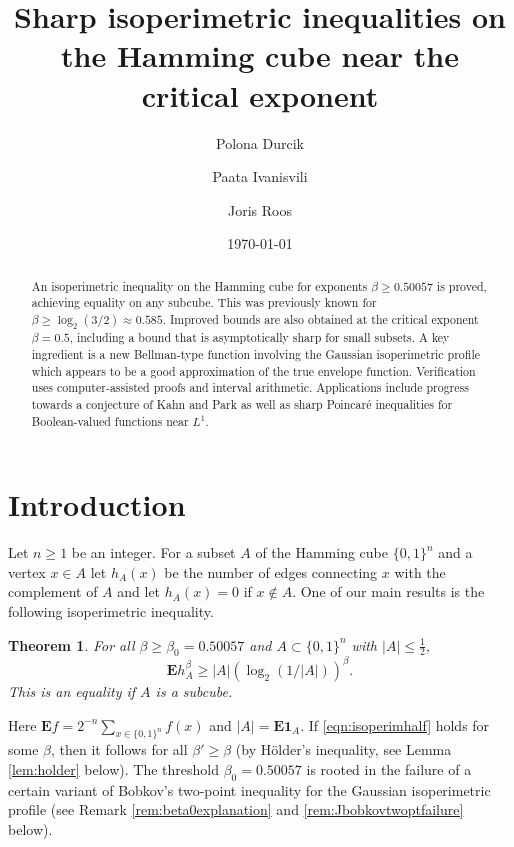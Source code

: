 \documentclass[12pt]{amsart}
\title[Sharp isoperimetric inequalities]{Sharp isoperimetric inequalities on the Hamming cube near the critical exponent}
\author[P. Durcik]{Polona Durcik}
\author[P. Ivanisvili]{Paata Ivanisvili}
\author[J. Roos]{Joris Roos}
\date{\today}
\theoremstyle{plain}
\newtheorem{thm}{Theorem}[section]
\theoremstyle{definition}
\theoremstyle{remark}
\numberwithin{equation}{section}
\begin{document}
\begin{abstract}
An isoperimetric inequality on the Hamming cube for exponents $\beta\ge 0.50057$ is proved, achieving equality on any subcube.  This was previously known for $\beta\ge \log_2(3/2)\approx 0.585$. 
Improved bounds are also obtained at the critical exponent $\beta=0.5$, including a bound that is asymptotically sharp for small subsets.
A key ingredient is a 
new Bellman-type function involving the Gaussian isoperimetric profile which appears to be a good approximation of the true envelope function. 
Verification uses computer-assisted proofs and interval arithmetic.
Applications include progress towards a conjecture of Kahn and Park as well as sharp Poincar\'e inequalities for Boolean-valued functions near $L^1$.
\end{abstract}


\maketitle

\section{Introduction}
Let $n\ge 1$ be an integer.  For a subset $A$ of the Hamming cube $\{0,1\}^n$ and a vertex $x\in A$ let 
$h_A(x)$ be the number of edges connecting $x$ with the complement of $A$ and
let $h_A(x)=0$ if $x\not\in A$. 
One of our main results is the following isoperimetric inequality.

\begin{thm}\label{thm:mainisoperim}
For all $\beta\ge \beta_0=0.50057$ and $A\subset \{0,1\}^n$ with $|A|\le \frac12$, \begin{equation}\label{eqn:isoperimhalf}
\mathbf{E} h_A^\beta \ge |A| (\log_2(1/|A|))^\beta.
\end{equation}
This is an equality if $A$ is a subcube. 
\end{thm}
Here $\mathbf{E}f=2^{-n} \sum_{x\in \{0,1\}^n} f(x)$ and $|A|=\mathbf{E} \mathbf{1}_A$. 
If \eqref{eqn:isoperimhalf} holds for some $\beta$, then it follows for all $\beta'\ge \beta$ (by H\"older's inequality, see Lemma \ref{lem:holder} below). The threshold $\beta_0=0.50057$ is rooted in the failure of a certain variant of Bobkov's two-point inequality for the Gaussian isoperimetric profile 
(see Remark \ref{rem:beta0explanation} and \ref{rem:Jbobkovtwoptfailure} below).
\end{document}
